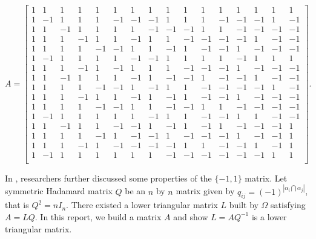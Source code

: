 \documentclass[11pt]{article}
\begin{document}
$$A = 
\left[\begin{smallmatrix}
    1 & 1 & 1 & 1 & 1 & 1 & 1 & 1 & 1 & 1 & 1 & 1 & 1 & 1 & 1 & 1 \\
    1 & -1 & 1  & 1  & 1  & -1 & -1 & -1 & 1  & 1  & 1  & -1 & -1 & -1 & 1  & -1 \\
    1 & 1  & -1 & 1  & 1  & 1  & 1  & -1 & -1 & -1 & 1  & 1  & -1 & -1 & -1 & -1 \\
    1 & 1  & 1  & -1 & 1  & 1  & -1 & 1  & 1  & -1 & -1 & -1 & -1 & 1  & -1 & -1 \\
    1 & 1  & 1  & 1  & -1 & -1 & 1  & 1  & -1 & 1  & -1 & -1 & 1  & -1 & -1 & -1 \\
    1 & -1 & 1  & 1  & 1  & 1  & -1 & -1 & 1  & 1  & 1  & 1  & -1 & 1  & 1  & 1  \\
    1 & 1  & 1  & -1 & 1  & -1 & 1  & 1  & 1  & -1 & -1 & -1 & 1  & -1 & -1 & -1 \\
    1 & 1  & -1 & 1  & 1  & 1  & -1 & 1  & -1 & -1 & 1  & -1 & -1 & 1  & -1 & -1 \\
    1 & 1  & 1  & 1  & -1 & -1 & 1  & -1 & 1  & 1  & -1 & -1 & -1 & -1 & 1  & -1 \\
    1 & 1  & 1  & -1 & 1  & 1  & -1 & 1  & -1 & 1  & -1 & -1 & 1  & -1 & -1 & -1 \\
    1 & 1  & 1  & 1  & -1 & -1 & 1  & 1  & -1 & -1 & 1  & 1  & -1 & -1 & -1 & -1 \\
    1 & -1 & 1  & 1  & 1  & 1  & 1  & -1 & 1  & 1  & -1 & -1 & 1  & 1  & -1 & -1 \\
    1 & 1  & -1 & 1  & 1  & -1 & -1 & 1  & -1 & 1  & -1 & 1  & -1 & -1 & -1 & 1  \\
    1 & 1  & 1  & 1  & -1 & 1  & -1 & -1 & 1  & -1 & -1 & -1 & 1  & -1 & -1 & 1  \\
    1 & 1  & 1  & -1 & 1  & -1 & -1 & -1 & -1 & 1  & 1  & -1 & -1 & 1  & -1 & 1  \\
    1 & -1 & 1  & 1  & 1  & 1  & 1  & 1  & -1 & -1 & -1 & -1 & -1 & -1 & 1  & 1  \\
\end{smallmatrix}\right].
$$

In \cite{ALON1997133}, researchers further discussed some properties of the $\{-1, 1\}$ matrix. Let symmetric Hadamard matrix $Q$ be an $n$ by $n$ matrix given by $q_{ij} = (-1)^{|\alpha_i\bigcap\alpha_j|}$, that is $Q^2 = nI_n$. There existed a lower triangular matrix $L$ built by $\Omega$ satisfying $A=LQ$. In this report, we build a matrix $A$ and show $L = AQ^{-1}$ is a lower triangular matrix.
\end{document}

